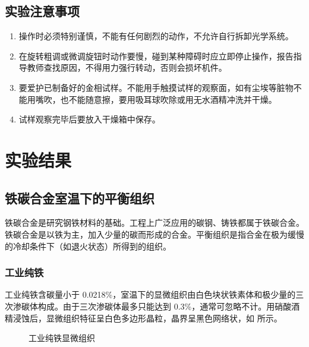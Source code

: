 \documentclass[a4paper,utf8]{article}
\begin{document}
    \subsection{实验注意事项}
        \begin{enumerate}
            \item 操作时必须特别谨慎，不能有任何剧烈的动作，不允许自行拆卸光学系统。
            \item 在旋转粗调或微调旋钮时动作要慢，碰到某种障碍时应立即停止操作，报告指导教师查找原因，不得用力强行转动，否则会损坏机件。
            \item 要爱护已制备好的金相试样。不能用手触摸试样的观察面，如有尘埃等脏物不能用嘴吹，也不能随意擦，要用吸耳球吹除或用无水酒精冲洗并干燥。
            \item 试样观察完毕后要放入干燥箱中保存。
        \end{enumerate}
\section{实验结果}
    \subsection{铁碳合金室温下的平衡组织}
    铁碳合金是研究钢铁材料的基础。工程上广泛应用的碳钢、铸铁都属于铁碳合金。铁碳合金是以铁为主，加入少量的碳而形成的合金。平衡组织是指合金在极为缓慢的冷却条件下（如退火状态）所得到的组织。\par
    \subsubsection{工业纯铁}
    工业纯铁含碳量小于 0.0218\%，室温下的显微组织由白色块状铁素体和极少量的三次渗碳体构成。由于三次渗碳体最多只能达到 0.3\%，通常可忽略不计。用硝酸酒精浸蚀后，显微组织特征呈白色多边形晶粒，晶界呈黑色网络状，如 所示。
    \begin{figure}[!ht]
        \hspace{20pt}
        \hspace{20pt}
        \caption{工业纯铁显微组织\label{fig:n1}}
    \end{figure}
\end{document}
